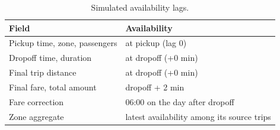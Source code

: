 \documentclass[11pt,a4paper]{article}
\begin{document}
\begin{table}[H]
\centering\small
\caption{Simulated availability lags.}
\label{tab:lags}
\begin{tabular}{@{}l l@{}}
\toprule
Field & Availability \\
\midrule
Pickup time, zone, passengers & at pickup (lag 0) \\
Dropoff time, duration & at dropoff (+0 min) \\
Final trip distance & at dropoff (+0 min) \\
Final fare, total amount & dropoff + 2 min \\
Fare correction & 06:00 on the day after dropoff \\
Zone aggregate & latest availability among its source trips \\
\bottomrule
\end{tabular}
\end{table}

\clearpage
{}
{}


\end{document}
